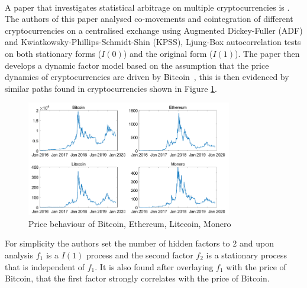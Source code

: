 \\[3mm]
A paper that investigates statistical arbitrage on multiple cryptocurrencies is \cite{Figa-TalamancaGianna2021Cdff}. The authors of this paper analysed co-movements and cointegration of different cryptocurrencies on a centralised exchange using Augmented Dickey-Fuller (ADF) and  Kwiatkowsky-Phillips-Schmidt-Shin (KPSS), Ljung-Box autocorrelation tests on both stationary forms ($I(0)$) and the original form ($I(1)$). The paper then develops a dynamic factor model based on the assumption that the price dynamics of cryptocurrencies are driven by Bitcoin~\cite{blau2020comovement}, this is then evidenced by similar paths found in cryptocurrencies shown in Figure \ref{fig:pricebehaviour}.
\begin{figure}[h!]
    \centering
    \includegraphics[width=0.8\textwidth]{background/Images/price_behaviour.png}
    \caption{Price behaviour of Bitcoin, Ethereum, Litecoin, Monero~\cite{Figa-TalamancaGianna2021Cdff}}
    \label{fig:pricebehaviour}
\end{figure}

\noindent For simplicity the authors set the number of hidden factors to 2 and upon analysis $f_1$ is a $I(1)$ process and the second factor $f_2$ is a stationary process that is independent of $f_1$. It is also found after overlaying $f_1$ with the price of Bitcoin, that the first factor strongly correlates with the price of Bitcoin.

